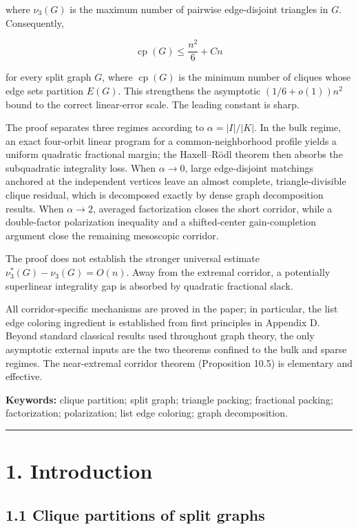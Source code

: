 \documentclass[
  11pt,
]{article}
\begin{document}
where \(\nu_3(G)\) is the maximum number of pairwise edge-disjoint triangles in \(G\). Consequently,

\[
\operatorname{cp}(G)
\le
\frac{n^2}{6}+Cn
\]

for every split graph \(G\), where \(\operatorname{cp}(G)\) is the minimum number of cliques whose edge sets partition \(E(G)\). This strengthens the asymptotic \((1/6+o(1))n^2\) bound to the correct linear-error scale. The leading constant is sharp.

The proof separates three regimes according to \(\alpha=|I|/|K|\). In the bulk regime, an exact four-orbit linear program for a common-neighborhood profile yields a uniform quadratic fractional margin; the Haxell--Rödl theorem then absorbs the subquadratic integrality loss. When \(\alpha\to0\), large edge-disjoint matchings anchored at the independent vertices leave an almost complete, triangle-divisible clique residual, which is decomposed exactly by dense graph decomposition results. When \(\alpha\to2\), averaged factorization closes the short corridor, while a double-factor polarization inequality and a shifted-center gain-completion argument close the remaining mesoscopic corridor.

The proof does not establish the stronger universal estimate \(\nu_3^*(G)-\nu_3(G)=O(n)\). Away from the extremal corridor, a potentially superlinear integrality gap is absorbed by quadratic fractional slack.

All corridor-specific mechanisms are proved in the paper; in particular, the list edge coloring ingredient is established from first principles in Appendix D. Beyond standard classical results used throughout graph theory, the only asymptotic external inputs are the two theorems confined to the bulk and sparse regimes. The near-extremal corridor theorem (Proposition 10.5) is elementary and effective.

\textbf{Keywords:} clique partition; split graph; triangle packing; fractional packing; factorization; polarization; list edge coloring; graph decomposition.

\begin{center}\rule{0.5\linewidth}{0.5pt}\end{center}

\section{1. Introduction}\label{introduction}

\subsection{1.1 Clique partitions of split graphs}\label{clique-partitions-of-split-graphs}
\end{document}
